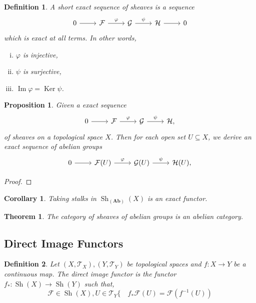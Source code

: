 \documentclass{article}
\newtheorem{theorem}{Theorem}[section]
\newtheorem{proposition}{Proposition}[section]
\newtheorem{definition}{Definition}[section]
\newtheorem{corollary}{Corollary}[section]
\numberwithin{equation}{section}
\DeclareMathOperator{\Sh}{Sh}
\DeclareMathOperator{\Ker}{Ker}
\DeclareMathOperator{\Image}{Im}
\begin{document}
\begin{definition}
A short exact sequence of sheaves is a sequence
\[
\begin{tikzcd}
0\arrow[r]&\mathcal{F}\arrow[r,"\varphi"]&\mathcal{G}\arrow[r,"\psi"]&\mathcal{H}\arrow[r]&0
\end{tikzcd}
\]
which is exact at all terms. In other words,
\begin{enumerate}[i).]
\item $\varphi$ is injective,
\item $\psi$ is surjective,
\item $\Image\varphi=\Ker\psi$.
\end{enumerate}
\end{definition}

\begin{proposition}
Given a exact sequence
\[
\begin{tikzcd}
0\arrow[r]&\mathcal{F}\arrow[r,"\varphi"]&\mathcal{G}\arrow[r,"\psi"]&\mathcal{H},
\end{tikzcd}
\]
of sheaves on a topological space $X$. Then for each open set $U\subseteq X$, we derive an exact sequence of abelian groups
\[
\begin{tikzcd}
0\arrow[r]&\mathcal{F}(U)\arrow[r,"\varphi"]&\mathcal{G}(U)\arrow[r,"\psi"]&\mathcal{H}(U),
\end{tikzcd}
\]
\end{proposition}

\begin{proof}
\end{proof}

\begin{corollary}
Taking stalks in $\Sh_{(\mathbf{Ab})}(X)$ is an exact functor.
\end{corollary}

\begin{theorem}
The category of sheaves of abelian groups is an abelian category.
\end{theorem}

\subsection{Direct Image Functors}

\begin{definition}
Let $(X,\mathcal{T}_X),(Y,\mathcal{T}_Y)$ be topological spaces and $f:X\to Y$ be a continuous map. The direct image functor is the functor $f_*:\Sh(X)\to\Sh(Y)$ such that,
\begin{equation*}
\mathcal{F}\in\Sh(X), U\in \mathcal{T}_Y \{\quad f_*\mathcal{F}(U) = \mathcal{F}(f^{-1}(U))
\end{equation*}
\end{definition}
\end{document}
